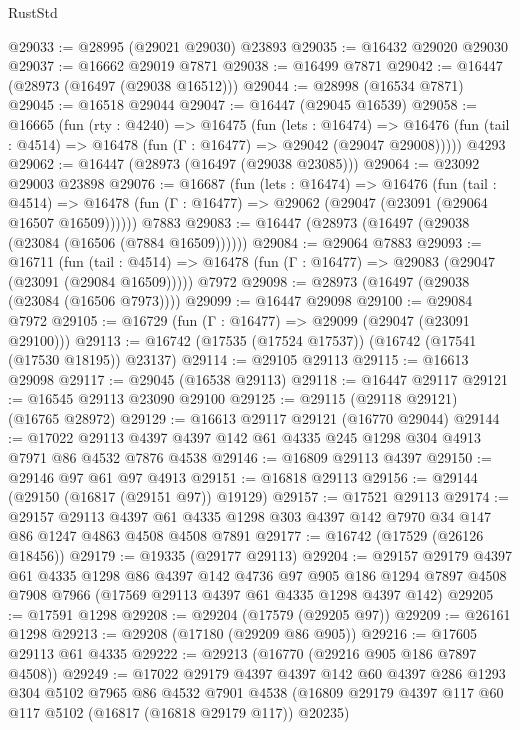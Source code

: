 \begin{lexlean}{RustStd}
\begin{coremodule}
{\begin{coremodule}
{{{{{{{{{{{{{{{{{{{{{{{{{{{{{{{{{{{{{{{{{{{{{{{{{{{{{{{@29033 := @28995 (@29021 @29030) @23893
@29035 := @16432 @29020 @29030
@29037 := @16662 @29019 @7871
@29038 := @16499 @7871
@29042 := @16447 (@28973 (@16497 (@29038 @16512)))
@29044 := @28998 (@16534 @7871)
@29045 := @16518 @29044
@29047 := @16447 (@29045 @16539)
@29058 := @16665
    (fun (rty : @4240) =>
    @16475
      (fun (lets : @16474) =>
      @16476 (fun (tail : @4514) => @16478 (fun (Γ : @16477) => @29042 (@29047 @29008)))))
    @4293
@29062 := @16447 (@28973 (@16497 (@29038 @23085)))
@29064 := @23092 @29003 @23898
@29076 := @16687
    (fun (lets : @16474) =>
    @16476
      (fun (tail : @4514) =>
      @16478 (fun (Γ : @16477) => @29062 (@29047 (@23091 (@29064 @16507 @16509))))))
    @7883
@29083 := @16447 (@28973 (@16497 (@29038 (@23084 (@16506 (@7884 @16509))))))
@29084 := @29064 @7883
@29093 := @16711
    (fun (tail : @4514) => @16478 (fun (Γ : @16477) => @29083 (@29047 (@23091 (@29084 @16509)))))
    @7972
@29098 := @28973 (@16497 (@29038 (@23084 (@16506 @7973))))
@29099 := @16447 @29098
@29100 := @29084 @7972
@29105 := @16729 (fun (Γ : @16477) => @29099 (@29047 (@23091 @29100)))
@29113 := @16742 (@17535 (@17524 @17537)) (@16742 (@17541 (@17530 @18195)) @23137)
@29114 := @29105 @29113
@29115 := @16613 @29098
@29117 := @29045 (@16538 @29113)
@29118 := @16447 @29117
@29121 := @16545 @29113 @23090 @29100
@29125 := @29115 (@29118 @29121) (@16765 @28972)
@29129 := @16613 @29117 @29121 (@16770 @29044)
@29144 := @17022 @29113 @4397 @4397 @142 @61 @4335 @245 @1298 @304 @4913 @7971 @86 @4532 @7876 @4538
@29146 := @16809 @29113 @4397
@29150 := @29146 @97 @61 @97 @4913
@29151 := @16818 @29113
@29156 := @29144 (@29150 (@16817 (@29151 @97)) @19129)
@29157 := @17521 @29113
@29174 := @29157
    @29113
    @4397
    @61
    @4335
    @1298
    @303
    @4397
    @142
    @7970
    @34
    @147
    @86
    @1247
    @4863
    @4508
    @4508
    @7891
@29177 := @16742 (@17529 (@26126 @18456))
@29179 := @19335 (@29177 @29113)
@29204 := @29157
    @29179
    @4397
    @61
    @4335
    @1298
    @86
    @4397
    @142
    @4736
    @97
    @905
    @186
    @1294
    @7897
    @4508
    @7908
    @7966
    (@17569 @29113 @4397 @61 @4335 @1298 @4397 @142)
@29205 := @17591 @1298
@29208 := @29204 (@17579 (@29205 @97))
@29209 := @26161 @1298
@29213 := @29208 (@17180 (@29209 @86 @905))
@29216 := @17605 @29113 @61 @4335
@29222 := @29213 (@16770 (@29216 @905 @186 @7897 @4508))
@29249 := @17022
    @29179
    @4397
    @4397
    @142
    @60
    @4397
    @286
    @1293
    @304
    @5102
    @7965
    @86
    @4532
    @7901
    @4538
    (@16809 @29179 @4397 @117 @60 @117 @5102 (@16817 (@16818 @29179 @117)) @20235)
}}}}}}}}}}}}}}}}}}}}}}}}}}}}}}}}}}}}}}}}}}}}}}}}}}}}}}}
\end{coremodule}}
\end{coremodule}
\end{lexlean}
